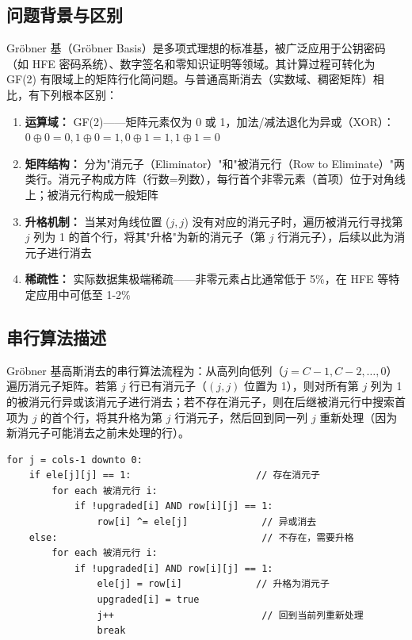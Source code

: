 \documentclass[a4paper]{article}
\begin{document}
\subsection{问题背景与区别}

Gröbner 基（Gröbner Basis）是多项式理想的标准基，被广泛应用于公钥密码（如 HFE 密码系统）、数字签名和零知识证明等领域。其计算过程可转化为 GF(2) 有限域上的矩阵行化简问题。与普通高斯消去（实数域、稠密矩阵）相比，有下列根本区别：

\begin{enumerate}
    \item \textbf{运算域：} GF(2)——矩阵元素仅为 0 或 1，加法/减法退化为异或（XOR）：$0 \oplus 0 = 0, 1 \oplus 0 = 1, 0 \oplus 1 = 1, 1 \oplus 1 = 0$
    \item \textbf{矩阵结构：} 分为"消元子（Eliminator）"和"被消元行（Row to Eliminate）"两类行。消元子构成方阵（行数=列数），每行首个非零元素（首项）位于对角线上；被消元行构成一般矩阵
    \item \textbf{升格机制：} 当某对角线位置 ($j,j$) 没有对应的消元子时，遍历被消元行寻找第 $j$ 列为 1 的首个行，将其"升格"为新的消元子（第 $j$ 行消元子），后续以此为消元子进行消去
    \item \textbf{稀疏性：} 实际数据集极端稀疏——非零元素占比通常低于 5\%，在 HFE 等特定应用中可低至 1-2\%
\end{enumerate}

\subsection{串行算法描述}

Gröbner 基高斯消去的串行算法流程为：从高列向低列（$j = C-1, C-2, \dots, 0$）遍历消元子矩阵。若第 $j$ 行已有消元子（$(j,j)$ 位置为 1），则对所有第 $j$ 列为 1 的被消元行异或该消元子进行消去；若不存在消元子，则在后继被消元行中搜索首项为 $j$ 的首个行，将其升格为第 $j$ 行消元子，然后回到同一列 $j$ 重新处理（因为新消元子可能消去之前未处理的行）。

\begin{lstlisting}[title=Gröbner 基串行算法伪代码,frame=trbl]
for j = cols-1 downto 0:
    if ele[j][j] == 1:                      // 存在消元子
        for each 被消元行 i:
            if !upgraded[i] AND row[i][j] == 1:
                row[i] ^= ele[j]             // 异或消去
    else:                                    // 不存在，需要升格
        for each 被消元行 i:
            if !upgraded[i] AND row[i][j] == 1:
                ele[j] = row[i]             // 升格为消元子
                upgraded[i] = true
                j++                          // 回到当前列重新处理
                break
\end{lstlisting}
\end{document}
